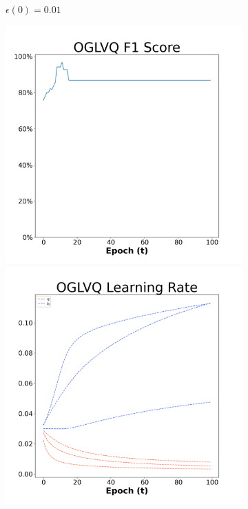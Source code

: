 \begin{figure}[H]
\begin{subfigure}{0.3\textwidth}
  \caption{$\epsilon(0)=0.01$}
\end{subfigure}\hfil %
\begin{subfigure}{0.3\textwidth}
  \includegraphics[width=\linewidth]{images/exper2/Ionosphere/OGLVQ_0.03_f1.png}
  \includegraphics[width=\linewidth]{images/exper2/Ionosphere/OGLVQ_0.03_lr.png}

\end{subfigure}
\end{figure}
